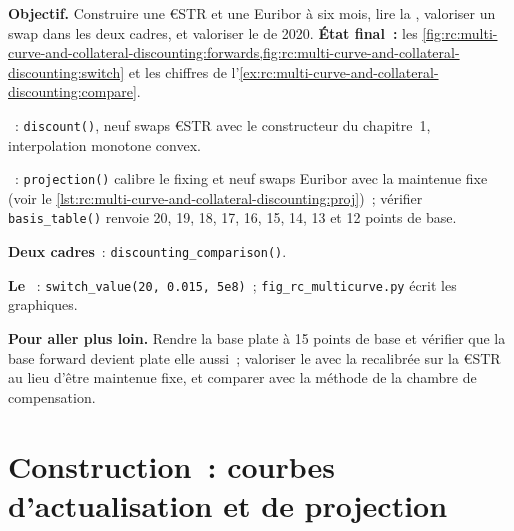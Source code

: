 \begin{tutorial}
\textbf{Objectif.} Construire une  €STR et une  Euribor à six mois,
lire la , valoriser un swap dans les deux cadres, et valoriser le
 de 2020. \textbf{État final~:}
les \cref{fig:rc:multi-curve-and-collateral-discounting:forwards,fig:rc:multi-curve-and-collateral-discounting:switch}
et les chiffres de l'\cref{ex:rc:multi-curve-and-collateral-discounting:compare}.
\begin{tutsteps}
\item \textbf{}~: \texttt{discount()}, neuf swaps €STR avec
le constructeur du chapitre~1, interpolation monotone convex.
\item \textbf{}~: \texttt{projection()} calibre le fixing et
neuf swaps Euribor avec la  maintenue fixe (voir le \cref{lst:rc:multi-curve-and-collateral-discounting:proj})~; vérifier
\texttt{basis\_table()} renvoie 20, 19, 18, 17, 16, 15, 14, 13 et 12 points
de base.
\item \textbf{Deux cadres}~: \texttt{discounting\_comparison()}.
\item \textbf{Le }~: \texttt{switch\_value(20, 0.015, 5e8)}~;
\texttt{fig\_rc\_multicurve.py} écrit les graphiques.
\end{tutsteps}
\textbf{Pour aller plus loin.} Rendre la base plate à 15 points de base et vérifier
que la base forward devient plate elle aussi~; valoriser le  avec la 
recalibrée sur la  €STR au lieu d'être maintenue fixe, et
comparer avec la méthode de la chambre de compensation.
\end{tutorial}

\section{Construction~: courbes d'actualisation et de projection}\label{bld:rc:multi-curve-and-collateral-discounting:multicurve}


